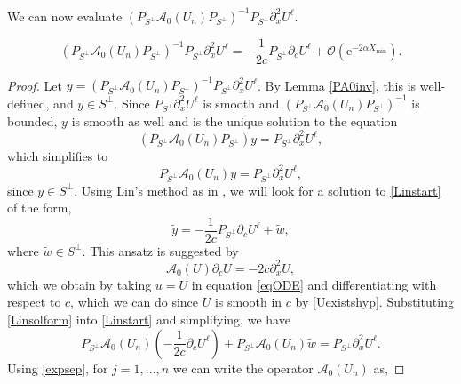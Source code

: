 \documentclass[review,onefignum,onetabnum]{siamart171218}
\newcommand{\rme}{\mathrm{e}}
\newcommand{\calA}{\mathcal{A}}
\begin{document}
We can now evaluate $(P_{S^\perp} \calA_0(U_n) P_{S^\perp})^{-1} P_{S^\perp}\partial_x^2U^\ell$.


\begin{lemma}\label{PA0invqxx}
\begin{equation}\label{invqxx}
(P_{S^\perp} \calA_0(U_n)P_{S^\perp})^{-1} P_{S^\perp}\partial_x^2U^\ell = -\frac{1}{2c}P_{S^\perp}\partial_cU^\ell
+ \mathcal{O}(\rme^{-2 \alpha X_{\mathrm{min}}}).
\end{equation}
\end{lemma}

\begin{proof}
Let $y = (P_{S^\perp} \calA_0(U_n)P_{S^\perp})^{-1} P_{S^\perp}\partial_x^2U^\ell$. By Lemma \ref{PA0inv}, this is well-defined, and $y \in S^\perp$. Since $P_{S^\perp}\partial_x^2U^\ell$ is smooth and $(P_{S^\perp} \calA_0(U_n)P_{S^\perp})^{-1}$ is bounded, $y$ is smooth as well and is the unique solution to the equation
\begin{equation*}
(P_{S^\perp} \calA_0(U_n) P_{S^\perp})y = P_{S^\perp}\partial_x^2U^\ell,
\end{equation*}
which simplifies to
\begin{equation}\label{Linstart}
P_{S^\perp} \calA_0(U_n) y = P_{S^\perp}\partial_x^2U^\ell,
\end{equation}
since $y \in S^\perp$. Using Lin's method as in \cite{sandstede:som98}, we will look for a solution to \cref{Linstart} of the form,
\begin{equation}\label{Linsolform}
\tilde{y} = -\frac{1}{2c} P_{S^\perp}\partial_cU^\ell + \tilde{w},
\end{equation}
where $\tilde{w} \in S^\perp$. This ansatz is suggested by
\begin{equation}\label{uc}
\calA_0(U) \partial_c U = -2 c\partial_x^2 U,
\end{equation}
which we obtain by taking $u = U$ in equation \cref{eqODE} and differentiating with respect to $c$, which we can do since $U$ is smooth in $c$ by \cref{Uexistshyp}. Substituting \cref{Linsolform} into \cref{Linstart} and simplifying, we have
\begin{equation}\label{Lin2}
P_{S^\perp} \calA_0(U_n) \left(-\frac{1}{2c} \partial_cU^\ell \right) + P_{S^\perp} \calA_0(U_n) \tilde{w} = P_{S^\perp}\partial_x^2U^\ell.
\end{equation}
Using \cref{expsep}, for $j = 1, \dots, n$ we can write the operator $\calA_0(U_n)$ as,

\end{proof}
\end{document}
